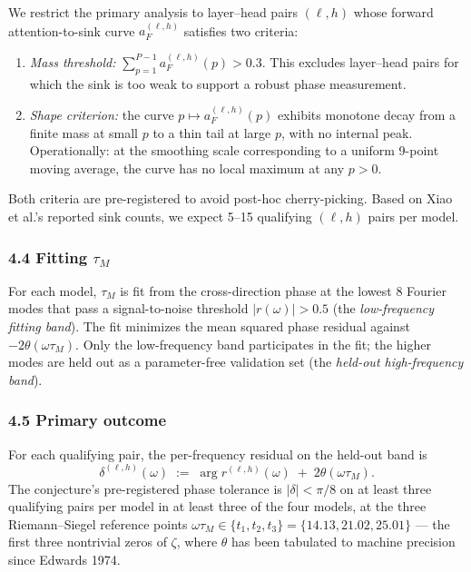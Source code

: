\documentclass[
  letterpaper,
  11pt]{article}
\providecommand{\tightlist}{%
  \setlength{\itemsep}{0pt}\setlength{\parskip}{0pt}}
\theoremstyle{plain}
\theoremstyle{definition}
\theoremstyle{remark}
\begin{document}
We restrict the primary analysis to layer--head pairs \((\ell, h)\) whose forward attention-to-sink curve \(a_F^{(\ell, h)}\) satisfies two criteria:

\begin{enumerate}
\def\labelenumi{\arabic{enumi}.}
\tightlist
\item
  \emph{Mass threshold:} \(\sum_{p=1}^{P-1} a_F^{(\ell, h)}(p) > 0.3\). This excludes layer--head pairs for which the sink is too weak to support a robust phase measurement.
\item
  \emph{Shape criterion:} the curve \(p \mapsto a_F^{(\ell, h)}(p)\) exhibits monotone decay from a finite mass at small \(p\) to a thin tail at large \(p\), with no internal peak. Operationally: at the smoothing scale corresponding to a uniform 9-point moving average, the curve has no local maximum at any \(p > 0\).
\end{enumerate}

Both criteria are pre-registered to avoid post-hoc cherry-picking. Based on Xiao et al.'s reported sink counts, we expect 5--15 qualifying \((\ell, h)\) pairs per model.

\subsubsection{\texorpdfstring{4.4 Fitting \(\tau_M\)}{4.4 Fitting \textbackslash tau\_M}}\label{fitting-tau_m}

For each model, \(\tau_M\) is fit from the cross-direction phase at the lowest 8 Fourier modes that pass a signal-to-noise threshold \(|r(\omega)| > 0.5\) (the \emph{low-frequency fitting band}). The fit minimizes the mean squared phase residual against \(-2\theta(\omega \tau_M)\). Only the low-frequency band participates in the fit; the higher modes are held out as a parameter-free validation set (the \emph{held-out high-frequency band}).

\subsubsection{4.5 Primary outcome}\label{primary-outcome}

For each qualifying pair, the per-frequency residual on the held-out band is
\[\delta^{(\ell, h)}(\omega) \;:=\; \arg r^{(\ell, h)}(\omega) \;+\; 2\theta(\omega \tau_M).\]
The conjecture's pre-registered phase tolerance is \(|\delta| < \pi/8\) on at least three qualifying pairs per model in at least three of the four models, at the three Riemann--Siegel reference points \(\omega \tau_M \in \{t_1, t_2, t_3\} = \{14.13, 21.02, 25.01\}\) --- the first three nontrivial zeros of \(\zeta\), where \(\theta\) has been tabulated to machine precision since Edwards 1974.
\end{document}
